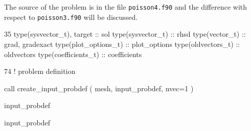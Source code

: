 The source of the problem is in the file \texttt{poisson4.f90} and the
difference with respect to \texttt{poisson3.f90} will be discussed. 
\bigskip
\begin{listing}{35}
  type(sysvector_t), target :: sol
  type(sysvector_t) :: rhsd
  type(vector_t) :: grad, gradexact
  type(plot_options_t) :: plot_options
  type(oldvectors_t) :: oldvectors
  type(coefficients_t) :: coefficients
\end{listing}
\bigskip
\begin{listing}{74}
! problem definition
                                                                                
  call create_input_probdef ( mesh, input_probdef, nvec=1 )
                                                                                
  input_probdef%

  input_probdef%
\end{listing}
\bigskip
